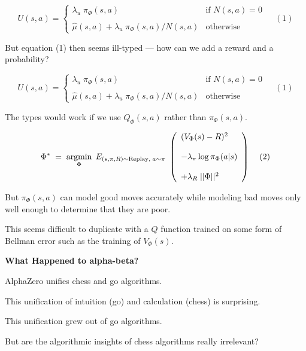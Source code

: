 {

$$U(s,a) =  \left\{\begin{array}{ll}\lambda_u \; \pi_\Phi(s,a) &\mbox{if $N(s,a) = 0$} \\ \\ \hat{\mu}(s,a) + \lambda_u\; \pi_\Phi(s,a)/N(s,a) & \mbox{otherwise} \end{array}\right. \;\;\;\;(1)$$

\vfill
But equation (1) then seems ill-typed --- how can we add a reward and a probability?


$$U(s,a) =  \left\{\begin{array}{ll}\lambda_u \; \pi_\Phi(s,a) &\mbox{if $N(s,a) = 0$} \\ \\ \hat{\mu}(s,a) + \lambda_u\; \pi_\Phi(s,a)/N(s,a) & \mbox{otherwise} \end{array}\right. \;\;\;\;(1)$$

\vfill
The types would work if we use $Q_\Phi(s,a)$ rather than $\pi_\Phi(s,a)$.


$$\Phi^*\; = \;\operatorname*{argmin}_\Phi \;E_{(s,\pi,R) \sim \mathrm{Replay},\;a \sim \pi}\;\left(\begin{array}{l} (V_\Phi(s) - R)^2 \\ \\ - \lambda_\pi\log \pi_\Phi(a|s) \\ \\ + \lambda_R\;||\Phi||^2\end{array}\right)\;\;\;\;(2)$$

\vfill
But $\pi_\Phi(s,a)$ can model good moves accurately while modeling bad moves only well enough to determine that they are poor.

\vfill
This seems difficult to duplicate with a $Q$ function
trained on some form of Bellman error such as the training of $V_\Phi(s)$.


\slide{}
\centerline{\bf What Happened to alpha-beta?}
\vfill


AlphaZero unifies chess and go algorithms.

\vfill
This unification of intuition (go) and calculation (chess) is surprising.

\vfill
This unification grew out of go algorithms.

\vfill
But are the algorithmic insights of chess algorithms really irrelevant?

}
